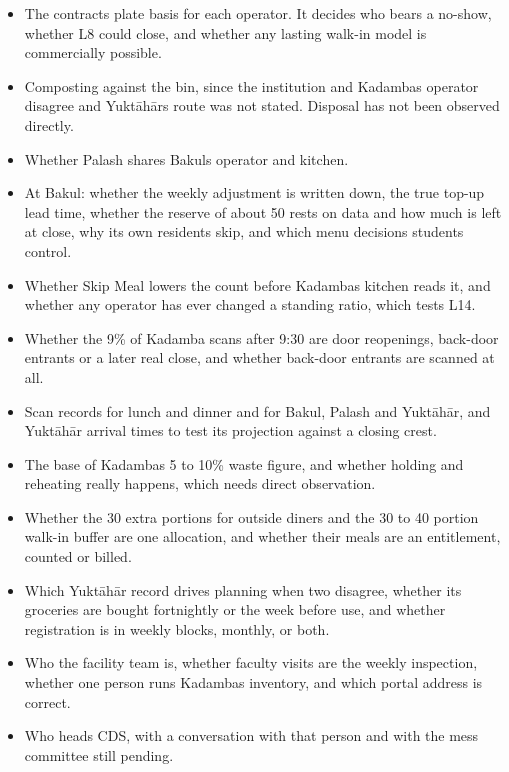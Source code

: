 \documentclass[
  10pt,
  table]{article}
\providecommand{\tightlist}{%
  \setlength{\itemsep}{0pt}\setlength{\parskip}{0pt}}
\renewcommand{\tightlist}{\setlength{\itemsep}{1.5pt}\setlength{\parskip}{0pt}}
\begin{document}
\begin{itemize}
\tightlist
\item
  The contract\textquotesingle s plate basis for each operator. It decides who bears a no-show, whether L8 could close, and whether any lasting walk-in model is commercially possible.
\item
  Composting against the bin, since the institution and Kadamba\textquotesingle s operator disagree and Yuktāhār\textquotesingle s route was not stated. Disposal has not been observed directly.
\item
  Whether Palash shares Bakul\textquotesingle s operator and kitchen.
\item
  At Bakul: whether the weekly adjustment is written down, the true top-up lead time, whether the reserve of about 50 rests on data and how much is left at close, why its own residents skip, and which menu decisions students control.
\item
  Whether Skip Meal lowers the count before Kadamba\textquotesingle s kitchen reads it, and whether any operator has ever changed a standing ratio, which tests L14.
\item
  Whether the 9\% of Kadamba scans after 9:30 are door reopenings, back-door entrants or a later real close, and whether back-door entrants are scanned at all.
\item
  Scan records for lunch and dinner and for Bakul, Palash and Yuktāhār, and Yuktāhār arrival times to test its projection against a closing crest.
\item
  The base of Kadamba\textquotesingle s 5 to 10\% waste figure, and whether holding and reheating really happens, which needs direct observation.
\item
  Whether the 30 extra portions for outside diners and the 30 to 40 portion walk-in buffer are one allocation, and whether their meals are an entitlement, counted or billed.
\item
  Which Yuktāhār record drives planning when two disagree, whether its groceries are bought fortnightly or the week before use, and whether registration is in weekly blocks, monthly, or both.
\item
  Who the facility team is, whether faculty visits are the weekly inspection, whether one person runs Kadamba\textquotesingle s inventory, and which portal address is correct.
\item
  Who heads CDS, with a conversation with that person and with the mess committee still pending.
\end{itemize}
\end{document}
